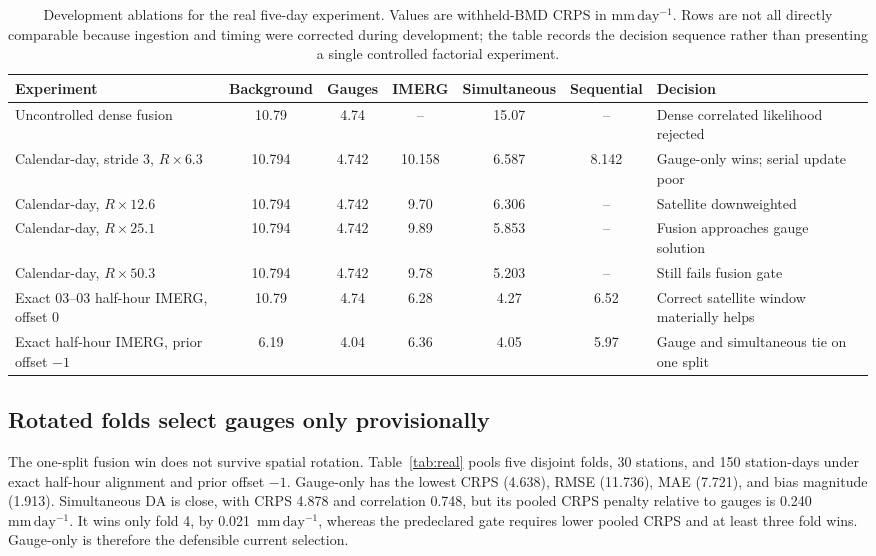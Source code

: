 \documentclass[10pt,twocolumn]{article}
\newcommand{\mmday}{\mathrm{mm\,day^{-1}}}
\begin{document}
\begin{table}[t]
\centering
\caption{Development ablations for the real five-day experiment. Values are withheld-BMD CRPS in $\mmday$. Rows are not all directly comparable because ingestion and timing were corrected during development; the table records the decision sequence rather than presenting a single controlled factorial experiment.}
\label{tab:ablation}
\small
\setlength{\tabcolsep}{3pt}
\begin{tabular}{p{}ccccc p{}}
\toprule
Experiment & Background & Gauges & IMERG & Simultaneous & Sequential & Decision \\
\midrule
Uncontrolled dense fusion & 10.79 & 4.74 & -- & 15.07 & -- & Dense correlated likelihood rejected \\
Calendar-day, stride 3, $R\times6.3$ & 10.794 & 4.742 & 10.158 & 6.587 & 8.142 & Gauge-only wins; serial update poor \\
Calendar-day, $R\times12.6$ & 10.794 & 4.742 & 9.70 & 6.306 & -- & Satellite downweighted \\
Calendar-day, $R\times25.1$ & 10.794 & 4.742 & 9.89 & 5.853 & -- & Fusion approaches gauge solution \\
Calendar-day, $R\times50.3$ & 10.794 & 4.742 & 9.78 & 5.203 & -- & Still fails fusion gate \\
Exact 03--03 half-hour IMERG, offset 0 & 10.79 & 4.74 & 6.28 & 4.27 & 6.52 & Correct satellite window materially helps \\
Exact half-hour IMERG, prior offset $-1$ & 6.19 & 4.04 & 6.36 & 4.05 & 5.97 & Gauge and simultaneous tie on one split \\
\bottomrule
\end{tabular}
\end{table}

\subsection{Rotated folds select gauges only provisionally}

The one-split fusion win does not survive spatial rotation. Table~\ref{tab:real} pools five disjoint folds, 30 stations, and 150 station-days under exact half-hour alignment and prior offset $-1$. Gauge-only has the lowest CRPS (4.638), RMSE (11.736), MAE (7.721), and bias magnitude (1.913). Simultaneous DA is close, with CRPS 4.878 and correlation 0.748, but its pooled CRPS penalty relative to gauges is 0.240~$\mmday$. It wins only fold 4, by 0.021~$\mmday$, whereas the predeclared gate requires lower pooled CRPS and at least three fold wins. Gauge-only is therefore the defensible current selection.
\end{document}
